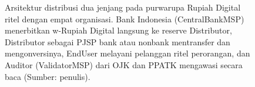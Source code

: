 \begin{figure}[H]
{%
}
\caption{Arsitektur distribusi dua jenjang pada purwarupa Rupiah Digital ritel dengan empat organisasi. Bank Indonesia (CentralBankMSP) menerbitkan w-Rupiah Digital langsung ke reserve Distributor, Distributor sebagai PJSP bank atau nonbank mentransfer dan mengonversinya, EndUser melayani pelanggan ritel perorangan, dan Auditor (ValidatorMSP) dari OJK dan PPATK mengawasi secara baca (Sumber: penulis).}
\label{fig:arsitektur-dua-jenjang}
\end{figure}
